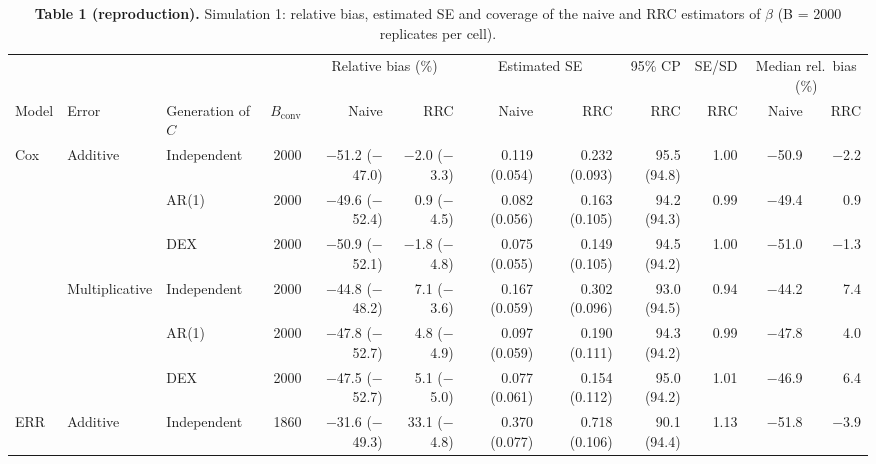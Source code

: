 \documentclass[10pt]{article}
\begin{document}
\begin{table}[ht]\centering\small
\begin{threeparttable}
\caption*{\textbf{Table 1 (reproduction).} Simulation 1: relative bias, estimated SE and coverage of the naive and RRC estimators of $\beta$ (B = 2000 replicates per cell).}
\begin{tabular}{lll r rr rr r r rr}
\toprule
 & & & & \multicolumn{2}{c}{Relative bias (\%)} & \multicolumn{2}{c}{Estimated SE} & 95\% CP & SE/SD & \multicolumn{2}{c}{Median rel.\ bias (\%)} \\
\cmidrule(lr){5-6}\cmidrule(lr){7-8}\cmidrule(lr){9-9}\cmidrule(lr){10-10}\cmidrule(l){11-12}
Model & Error & Generation of $C$ & $B_{\mathrm{conv}}$ & Naive & RRC & Naive & RRC & RRC & RRC & Naive & RRC \\
\midrule
\multirow{6}{*}{Cox} & \multirow{3}{*}{Additive} & Independent & 2000 & $-$51.2 {\color{gray}($-$47.0)} & $-$2.0 {\color{gray}($-$3.3)} & 0.119 {\color{gray}(0.054)} & 0.232 {\color{gray}(0.093)} & 95.5 {\color{gray}(94.8)} & 1.00 & $-$50.9 & $-$2.2 \\
 &  & AR(1) & 2000 & $-$49.6 {\color{gray}($-$52.4)} & 0.9 {\color{gray}($-$4.5)} & 0.082 {\color{gray}(0.056)} & 0.163 {\color{gray}(0.105)} & 94.2 {\color{gray}(94.3)} & 0.99 & $-$49.4 & 0.9 \\
 &  & DEX & 2000 & $-$50.9 {\color{gray}($-$52.1)} & $-$1.8 {\color{gray}($-$4.8)} & 0.075 {\color{gray}(0.055)} & 0.149 {\color{gray}(0.105)} & 94.5 {\color{gray}(94.2)} & 1.00 & $-$51.0 & $-$1.3 \\
\cmidrule(l){2-12}
 & \multirow{3}{*}{Multiplicative} & Independent & 2000 & $-$44.8 {\color{gray}($-$48.2)} & 7.1 {\color{gray}($-$3.6)} & 0.167 {\color{gray}(0.059)} & 0.302 {\color{gray}(0.096)} & 93.0 {\color{gray}(94.5)} & 0.94 & $-$44.2 & 7.4 \\
 &  & AR(1) & 2000 & $-$47.8 {\color{gray}($-$52.7)} & 4.8 {\color{gray}($-$4.9)} & 0.097 {\color{gray}(0.059)} & 0.190 {\color{gray}(0.111)} & 94.3 {\color{gray}(94.2)} & 0.99 & $-$47.8 & 4.0 \\
 &  & DEX & 2000 & $-$47.5 {\color{gray}($-$52.7)} & 5.1 {\color{gray}($-$5.0)} & 0.077 {\color{gray}(0.061)} & 0.154 {\color{gray}(0.112)} & 95.0 {\color{gray}(94.2)} & 1.01 & $-$46.9 & 6.4 \\
\midrule
\multirow{6}{*}{ERR} & \multirow{3}{*}{Additive} & Independent & 1860 & $-$31.6 {\color{gray}($-$49.3)} & 33.1 {\color{gray}($-$4.8)} & 0.370 {\color{gray}(0.077)} & 0.718 {\color{gray}(0.106)} & 90.1 {\color{gray}(94.4)} & 1.13 & $-$51.8 & $-$3.9 \\

\end{tabular}
\end{threeparttable}
\end{table}
\end{document}
